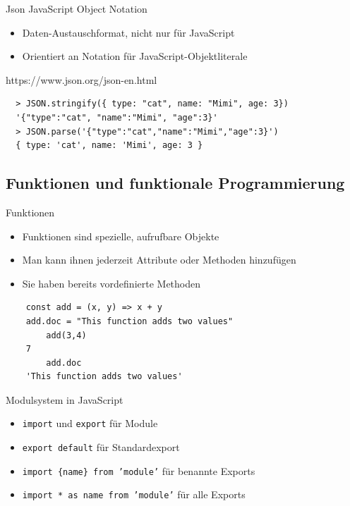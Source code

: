 \begin{concept}{Json}
    JavaScript Object Notation
    \begin{itemize}
    \item Daten-Austauschformat, nicht nur für JavaScript
    \item Orientiert an Notation für JavaScript-Objektliterale
  \end{itemize}
  https://www.json.org/json-en.html
\end{concept}
  
  \begin{verbatim}
  > JSON.stringify({ type: "cat", name: "Mimi", age: 3})
  '{"type":"cat", "name":"Mimi", "age":3}'
  > JSON.parse('{"type":"cat","name":"Mimi","age":3}')
  { type: 'cat', name: 'Mimi', age: 3 }
  \end{verbatim}


\subsection{Funktionen und funktionale Programmierung}

\begin{definition}{Funktionen}
    \begin{itemize}
        \item Funktionen sind spezielle, aufrufbare Objekte
        \item Man kann ihnen jederzeit Attribute oder Methoden hinzufügen
        \item Sie haben bereits vordefinierte Methoden
      \end{itemize}
\end{definition}

\begin{verbatim}
    const add = (x, y) => x + y
    add.doc = "This function adds two values"
        add(3,4)
    7
        add.doc
    'This function adds two values'
\end{verbatim}

\begin{concept}{Modulsystem in JavaScript}
    \begin{itemize}
        \item \texttt{import} und \texttt{export} für Module
        \item \texttt{export default} für Standardexport
        \item \texttt{import \{name\} from 'module'} für benannte Exports
        \item \texttt{import * as name from 'module'} für alle Exports
    \end{itemize}
\end{concept}


